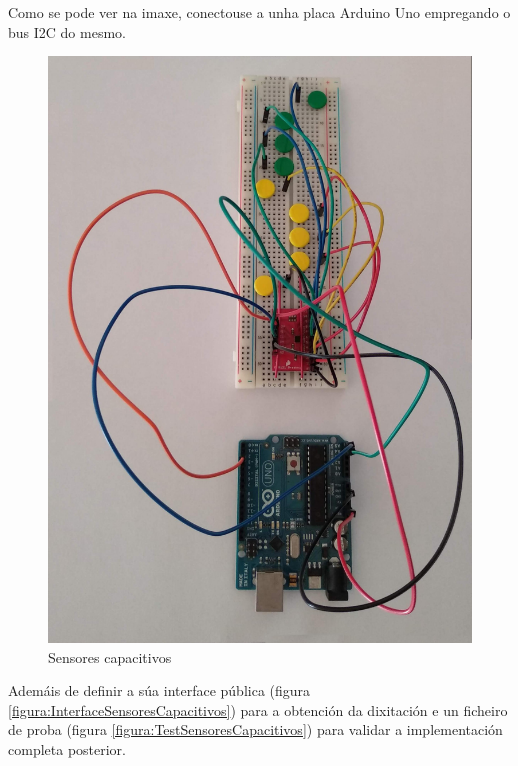    Como se pode ver na imaxe, conectouse a unha placa Arduino Uno empregando
   o bus I2C do mesmo. \\
  
   \begin{figure}[htbp]
    \centering
    \includegraphics[scale=0.2,keepaspectratio=true]{./imagenes/sensores-capacitivos.jpg}
    \caption{Sensores capacitivos}
    \label{figura:SensoresCapacitivos}
   \end{figure}
   
   Ademáis de definir a súa interface pública (figura 
   \ref{figura:InterfaceSensoresCapacitivos}) para a obtención da dixitación e
   un ficheiro de proba (figura \ref{figura:TestSensoresCapacitivos}) para
   validar a implementación completa posterior. \\
   
